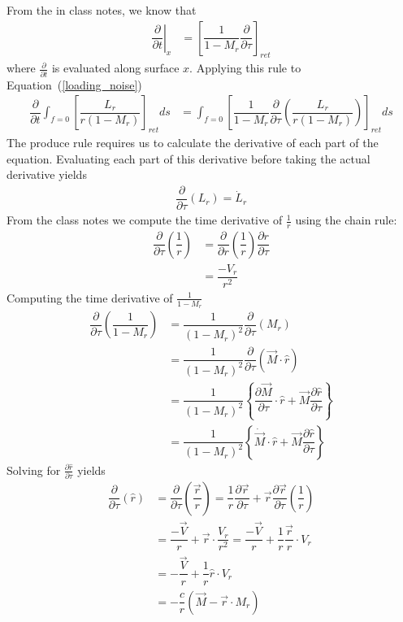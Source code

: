 \documentclass[onecolumn,10pt]{jhwhw}
\begin{document}
\solution
From the in class notes, we know that
\begin{align*}
\left. \dfrac{\partial}{\partial t} \right|_x &= \left[ \dfrac{1}{1 - M_r} \dfrac{\partial}{\partial \tau} \right]_{ret}
\end{align*}
where $\frac{\partial}{\partial t}$ is evaluated along surface $x$. Applying this rule to Equation~(\ref{loading_noise})
\begin{align} \label{where_am_i}
\dfrac{\partial}{\partial t} \int_{f=0} \left[ \dfrac{L_r}{r (1 - M_r)} \right]_{ret} ds
&= \int_{f=0} \left[
    \dfrac{1}{1 - M_r} \dfrac{\partial}{\partial \tau}
    \left( \dfrac{L_r}{r   (1 - M_r)}  \right)
    \right]_{ret} ds
\end{align}
The produce rule requires us to calculate the derivative of each part of the equation. Evaluating each part of this derivative before taking the actual derivative yields
\begin{align*}
\dfrac{\partial}{\partial\tau} \left( L_r \right) = \dot{L}_r
\end{align*}
From the class notes we compute the time derivative of $\frac{1}{r}$ using the chain rule:
\begin{align*}
\dfrac{\partial}{\partial\tau} \left( \dfrac{1}{r} \right)
&= \dfrac{\partial}{\partial r} \left( \dfrac{1}{r} \right) \dfrac{\partial r}{\partial\tau} \\
&= \dfrac{-V_r}{r^2}
\end{align*}
Computing the time derivative of $\frac{1}{1 - M_r}$
\begin{align}
\dfrac{\partial}{\partial\tau} \left( \dfrac{1}{1 - M_r} \right)
&= \dfrac{1}{(1 - M_r)^2} \dfrac{\partial}{\partial\tau}(M_r) \nonumber \\
&= \dfrac{1}{(1 - M_r)^2} \dfrac{\partial}{\partial\tau} \left( \vec{M} \cdot \hat{r} \right) \nonumber \\
&= \dfrac{1}{(1 - M_r)^2} \left \{ \dfrac{\partial\vec{M}}{\partial\tau} \cdot\hat{r} + \vec{M} \dfrac{\partial\hat{r}}{\partial\tau} \right \} \nonumber \\
&= \dfrac{1}{(1 - M_r)^2} \left \{ \dot{\vec{M}}\cdot\hat{r} + \vec{M} \dfrac{\partial\hat{r}}{\partial\tau} \right \}  \label{yolo2}
\end{align}
Solving for $\frac{\partial\hat{r}}{\partial\tau}$ yields
\begin{align}
\dfrac{\partial}{\partial\tau} \left( \hat{r} \right)
&= \dfrac{\partial}{\partial\tau} \left( \dfrac{\vec{r}}{r} \right)
    = \dfrac{1}{r} \dfrac{\partial \vec{r}}{\partial\tau}
    + \vec{r}\dfrac{\partial\vec{r}}{\partial\tau} \left(\dfrac{1}{r} \right) \nonumber \\
&= \dfrac{-\vec{V}}{r} + \vec{r} \cdot \dfrac{V_r}{r^2}
    = \dfrac{-\vec{V}}{r} + \dfrac{1}{r} \dfrac{\vec{r}}{r} \cdot V_r  \nonumber \\
&= -\dfrac{\vec{V}}{r} + \dfrac{1}{r} \hat{r} \cdot V_r \nonumber \\
&= -\dfrac{c}{r} \left( \vec{M} - \vec{r} \cdot M_r \right) \label{yolo3}
\end{align}
\end{document}
